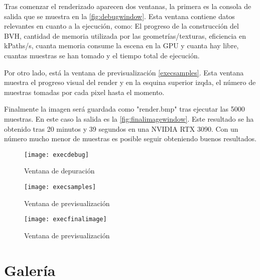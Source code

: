 Tras comenzar el renderizado aparecen dos ventanas, la primera es la consola de salida que se muestra en la \autoref{fig:debugwindow}. Esta ventana contiene datos relevantes en cuanto a la ejecución, como: El progreso de la construcción del BVH, cantidad de memoria utilizada por las geometrías/texturas, eficiencia en kPaths/s, cuanta memoria consume la escena en la GPU y cuanta hay libre, cuantas muestras se han tomado y el tiempo total de ejecución.

Por otro lado, está la ventana de previsualización \autoref{execsamples}. Esta ventana muestra el progreso visual del render y en la esquina superior izqda, el número de muestras tomadas por cada pixel hasta el momento.

Finalmente la imagen será guardada como "render.bmp" tras ejecutar las 5000 muestras. En este caso la salida es la \autoref{fig:finalimagewindow}. Este resultado se ha obtenido tras 20 minutos y 39 segundos en una NVIDIA RTX 3090. Con un número mucho menor de muestras es posible seguir obteniendo buenos resultados.

\begin{figure}[H]
    \centering
	\texttt{[image: execdebug]}
	\caption{Ventana de depuración}
	\label{fig:debugwindow}
\end{figure}

\begin{figure}[H]
    \centering
	\texttt{[image: execsamples]}
	\caption{Ventana de previsualización}
	\label{fig:samplewindow}
\end{figure}

\begin{figure}[H]
    \centering
	\texttt{[image: execfinalimage]}
	\caption{Ventana de previsualización}
	\label{fig:finalimagewindow}
\end{figure}

\section{Galería}
	
